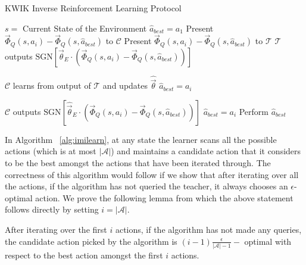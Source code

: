 \begin{algorithm}[H]
\caption{KWIK Inverse Reinforcement Learning Protocol}
\label{alg:imilearn}
\begin{algorithmic}
        \State $s = $ Current State of the Environment
        \State $\hat{a}_{best} = a_1$
            \State Present $\vec{\Phi}_Q(s,a_i) - \vec{\Phi}_Q(s,\hat{a}_{best})$ to $\mathcal{C}$
                \State Present  $\vec{\Phi}_Q(s,a_i) - \vec{\Phi}_Q(s,\hat{a}_{best})$ to  $\mathcal{T}$
               \State $\mathcal{T}$ outputs  $\text{SGN}[{\vec{\theta}}_E \cdot(\vec{\Phi}_Q(s,a_i) - \vec{\Phi}_Q(s,\hat{a}_{best}))]$

                \State $\mathcal{C}$ learns from output of $\mathcal{T}$ and updates $\hat{\vec{\theta}}$
                    \State $\hat{a}_{best} = a_i$
                \EndIf
            
            \Else
                \State $\mathcal{C}$ outputs $\text{SGN}[\hat{\vec{\theta}}_E \cdot(\vec{\Phi}_Q(s,a_i) - \vec{\Phi}_Q(s,\hat{a}_{best}))]$
                    \State $\hat{a}_{best} = a_i$
                \EndIf
            \EndIf
        \EndFor
        \State Perform $\hat{a}_{best}$
    \EndFor
\end{algorithmic}
\end{algorithm}



In Algorithm ~\ref{alg:imilearn}, at any state the learner scans all the possible actions (which is at most $|\mathcal{A}|$) and maintains a candidate action that it considers to be the best amongst the actions that have been iterated through. The correctness of this algorithm would follow if we show that after iterating over all the actions, if the algorithm has not queried the teacher, it always chooses an $\epsilon$-optimal action. We prove the following lemma from which the above statement follows directly by setting $i=|\mathcal{A}|$. 

\begin{thm} After iterating over the first $i$ actions, if the algorithm has not made any queries, the candidate action picked by the algorithm is $(i-1)\displaystyle\frac{\epsilon}{|\mathcal{A}|-1}-$ optimal with respect to the best action amongst the first $i$ actions.
\end{thm}


